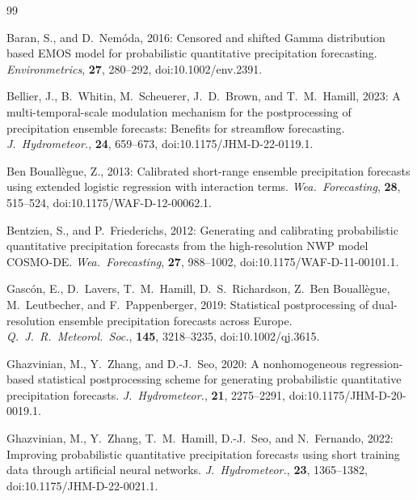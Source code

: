 \documentclass[11pt]{article}
\begin{document}
\begin{thebibliography}{99}

Baran, S., and D.\ Nem\'{o}da, 2016:
Censored and shifted Gamma distribution based EMOS model for probabilistic
quantitative precipitation forecasting.
\textit{Environmetrics}, \textbf{27}, 280--292,
doi:10.1002/env.2391.

Bellier, J., B.\ Whitin, M.\ Scheuerer, J.~D.\ Brown, and T.~M.\ Hamill, 2023:
A multi-temporal-scale modulation mechanism for the postprocessing of
precipitation ensemble forecasts: Benefits for streamflow forecasting.
\textit{J.\ Hydrometeor.}, \textbf{24}, 659--673,
doi:10.1175/JHM-D-22-0119.1.

Ben Bouall\`{e}gue, Z., 2013:
Calibrated short-range ensemble precipitation forecasts using extended
logistic regression with interaction terms.
\textit{Wea.\ Forecasting}, \textbf{28}, 515--524,
doi:10.1175/WAF-D-12-00062.1.

Bentzien, S., and P.\ Friederichs, 2012:
Generating and calibrating probabilistic quantitative precipitation forecasts
from the high-resolution NWP model COSMO-DE.
\textit{Wea.\ Forecasting}, \textbf{27}, 988--1002,
doi:10.1175/WAF-D-11-00101.1.

Gasc\'{o}n, E., D.\ Lavers, T.~M.\ Hamill, D.~S.\ Richardson,
Z.\ Ben Bouall\`{e}gue, M.\ Leutbecher, and F.\ Pappenberger, 2019:
Statistical postprocessing of dual-resolution ensemble precipitation forecasts
across Europe.
\textit{Q.\ J.\ R.\ Meteorol.\ Soc.}, \textbf{145}, 3218--3235,
doi:10.1002/qj.3615.

Ghazvinian, M., Y.\ Zhang, and D.-J.\ Seo, 2020:
A nonhomogeneous regression-based statistical postprocessing scheme for
generating probabilistic quantitative precipitation forecasts.
\textit{J.\ Hydrometeor.}, \textbf{21}, 2275--2291,
doi:10.1175/JHM-D-20-0019.1.

Ghazvinian, M., Y.\ Zhang, T.~M.\ Hamill, D.-J.\ Seo, and N.\ Fernando, 2022:
Improving probabilistic quantitative precipitation forecasts using short
training data through artificial neural networks.
\textit{J.\ Hydrometeor.}, \textbf{23}, 1365--1382,
doi:10.1175/JHM-D-22-0021.1.


\end{thebibliography}
\end{document}
